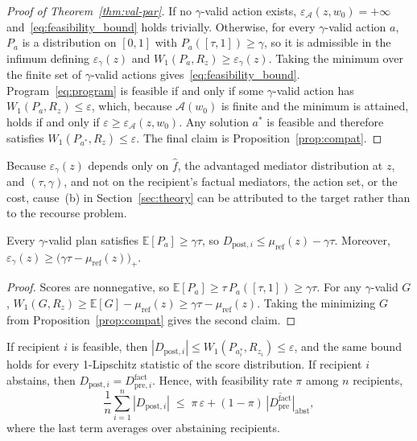\begin{proof}[Proof of Theorem~\ref{thm:val-par}]
If no $\gamma$-valid action exists, $\varepsilon_{\mathcal A}(z,w_0)=+\infty$
and~\eqref{eq:feasibility_bound} holds trivially. Otherwise, for every
$\gamma$-valid action $a$, $P_a$ is a distribution on $[0,1]$ with
$P_a([\tau,1])\ge\gamma$, so it is admissible in the infimum defining
$\varepsilon_\gamma(z)$ and $W_1(P_a,R_z)\ge\varepsilon_\gamma(z)$. Taking the
minimum over the finite set of $\gamma$-valid actions
gives~\eqref{eq:feasibility_bound}. Program~\eqref{eq:program} is feasible if
and only if some $\gamma$-valid action has $W_1(P_a,R_z)\le\varepsilon$, which,
because $\mathcal A(w_0)$ is finite and the minimum is attained, holds if and
only if $\varepsilon\ge\varepsilon_{\mathcal A}(z,w_0)$. Any solution $a^*$ is
feasible and therefore satisfies $W_1(P_{a^*},R_z)\le\varepsilon$. The final
claim is Proposition~\ref{prop:compat}.
\end{proof}

\noindent Because $\varepsilon_\gamma(z)$ depends only on $\hat f$, the
advantaged mediator distribution at $z$, and $(\tau,\gamma)$, and not on the
recipient's factual mediators, the action set, or the cost, cause~(b) in
Section~\ref{sec:theory} can be attributed to the target rather than to the
recourse problem.

\begin{proposition}
\label{prop:overshoot}
Every $\gamma$-valid plan satisfies $\mathbb E[P_a]\ge\gamma\tau$, so
$D_{\mathrm{post},i}\le\mu_{\mathrm{ref}}(z)-\gamma\tau$. Moreover,
$\varepsilon_\gamma(z)\ge\bigl(\gamma\tau-\mu_{\mathrm{ref}}(z)\bigr)_+$.
\end{proposition}

\begin{proof}
Scores are nonnegative, so
$\mathbb E[P_a]\ge\tau\,P_a([\tau,1])\ge\gamma\tau$. For any $\gamma$-valid $G$,
$W_1(G,R_z)\ge\mathbb E[G]-\mu_{\mathrm{ref}}(z)\ge\gamma\tau-\mu_{\mathrm{ref}}(z)$.
Taking the minimizing $G$ from Proposition~\ref{prop:compat} gives the
second claim.
\end{proof}

\begin{proposition}
\label{prop:guarantee}
If recipient $i$ is feasible, then
$|D_{\mathrm{post},i}|\le W_1(P_{a^*_i},R_{z_i})\le\varepsilon$, and the same bound
holds for every 1-Lipschitz statistic of the score distribution. If recipient
$i$ abstains, then $D_{\mathrm{post},i}=D^{\mathrm{fact}}_{\mathrm{pre},i}$.
Hence, with feasibility rate $\pi$ among $n$ recipients,
\begin{equation}
  \frac1n\sum_{i=1}^n|D_{\mathrm{post},i}|
  \;\le\;\pi\,\varepsilon+(1-\pi)\,
  \overline{|D^{\mathrm{fact}}_{\mathrm{pre}}|}_{\mathrm{abst}},
  \label{eq:guarantee}
\end{equation}
where the last term averages over abstaining recipients.
\end{proposition}

